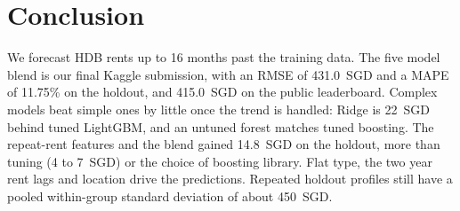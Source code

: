 \section{Conclusion}\label{sec:conclusion}

We forecast HDB rents up to 16 months past the training data. The five model blend is our final Kaggle submission, with an RMSE of 431.0~SGD and a MAPE of 11.75\% on the holdout, and 415.0~SGD on the public leaderboard. Complex models beat simple ones by little once the trend is handled: Ridge is 22~SGD behind tuned LightGBM, and an untuned forest matches tuned boosting. The repeat-rent features and the blend gained 14.8~SGD on the holdout, more than tuning (4 to 7~SGD) or the choice of boosting library. Flat type, the two year rent lags and location drive the predictions. Repeated holdout profiles still have a pooled within-group standard deviation of about 450~SGD.
